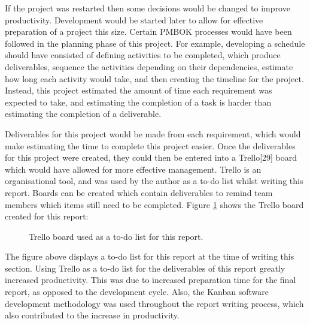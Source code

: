 \documentclass{article}
\begin{document}
If the project was restarted then some decisions would be changed to improve productivity. Development would be started later to allow for effective preparation of a project this size. Certain PMBOK processes would have been followed in the planning phase of this project. For example, developing a schedule should have consisted of defining activities to be completed, which produce deliverables, sequence the activities depending on their dependencies, estimate how long each activity would take, and then creating the timeline for the project. Instead, this project estimated the amount of time each requirement was expected to take, and estimating the completion of a task is harder than estimating the completion of a deliverable. \par

Deliverables for this project would be made from each requirement, which would make estimating the time to complete this project easier. Once the deliverables for this project were created, they could then be entered into a Trello[29] board which would have allowed for more effective management. Trello is an organisational tool, and was used by the author as a to-do list whilst writing this report. Boards can be created which contain deliverables to remind team members which items still need to be completed. Figure \ref{figure:trelloBoard} shows the Trello board created for this report: 

\begin{figure}[H]
	\centering
	\caption{Trello board used as a to-do list for this report.}
	\label{figure:trelloBoard}
\end{figure}

The figure above displays a to-do list for this report at the time of writing this section. Using Trello as a to-do list for the deliverables of this report greatly increased productivity. This was due to increased preparation time for the final report, as opposed to the development cycle. Also, the Kanban software development methodology was used throughout the report writing process, which also contributed to the increase in productivity. \par
\end{document}
